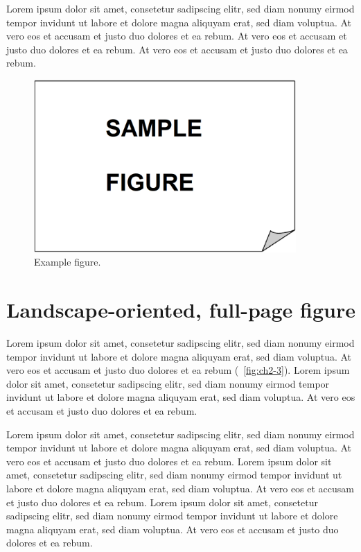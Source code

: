 Lorem ipsum dolor sit amet, consetetur sadipscing elitr, sed diam nonumy eirmod tempor invidunt ut labore et dolore magna aliquyam erat, sed diam voluptua. At vero eos et accusam et justo duo dolores et ea rebum. At vero eos et accusam et justo duo dolores et ea rebum. At vero eos et accusam et justo duo dolores et ea rebum.

\vspace{6pt} %
\begin{figure}[ht]
    \centering
    \includegraphics[width=10cm,keepaspectratio=true]{./fig/sekil2.png}
    \caption{Example figure.}
    \label{fig:ch2-2}
\end{figure}
\vspace{-6pt} %

\section{Landscape-oriented, full-page figure}

Lorem ipsum dolor sit amet, consetetur sadipscing elitr, sed diam nonumy eirmod tempor invidunt ut labore et dolore magna aliquyam erat, sed diam voluptua. At vero eos et accusam et justo duo dolores et ea rebum (\figurename\ \ref{fig:ch2-3}). Lorem ipsum dolor sit amet, consetetur sadipscing elitr, sed diam nonumy eirmod tempor invidunt ut labore et dolore magna aliquyam erat, sed diam voluptua. At vero eos et accusam et justo duo dolores et ea rebum. 

Lorem ipsum dolor sit amet, consetetur sadipscing elitr, sed diam nonumy eirmod tempor invidunt ut labore et dolore magna aliquyam erat, sed diam voluptua. At vero eos et accusam et justo duo dolores et ea rebum. Lorem ipsum dolor sit amet, consetetur sadipscing elitr, sed diam nonumy eirmod tempor invidunt ut labore et dolore magna aliquyam erat, sed diam voluptua. At vero eos et accusam et justo duo dolores et ea rebum. Lorem ipsum dolor sit amet, consetetur sadipscing elitr, sed diam nonumy eirmod tempor invidunt ut labore et dolore magna aliquyam erat, sed diam voluptua. At vero eos et accusam et justo duo dolores et ea rebum.   

